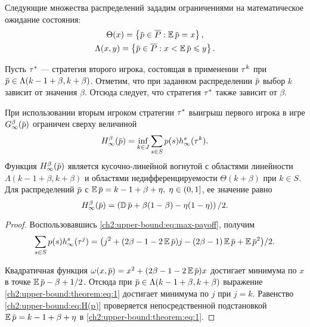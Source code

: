{Следующие множества распределений зададим ограничениями на математическое ожидание состояния:
\begin{gather*}
  \Theta(x) = \left\{ \pd \in \PM: \E \pd = x \right\}, \\
  \Lambda(x, y) = \left\{ \pd \in \PM: x < \E \pd \leqslant y \right\}.
\end{gather*}

Пусть $\tau^*$ --- стратегия второго игрока, состоящая в применении $\tau^k$ при $\pd \in \Lambda(k-1+\beta,k+\beta)$.
Отметим, что при заданном распределении $\pd$ выбор $k$ зависит от значения $\beta$.
Отсюда следует, что стратегия $\tau^*$ также зависит от $\beta$.

\begin{theorem}
  \label{ch2:upper-bound:theorem}
  При использовании вторым игроком стратегии $\tau^*$ выигрыш первого игрока в игре
  $\theG{\infty}(\pd)$ ограничен сверху величиной
  \begin{equation*}
    \H{\infty}(\pd) = \inf_{k \in J} \sum_{s \in S} \pc{s}  h^s_\infty(\taur^k).
  \end{equation*}
  Функция $\H{\infty}(\pd)$ является кусочно-линейной вогнутой с областями линейности $\Lambda(k - 1 + \beta, k + \beta)$ и областями недифференцируемости $\Theta(k+\beta)$ при $k \in S$.
  Для распределений $\pd$ с $\E \pd = k - 1 + \beta + \eta, \; \eta \in (0, 1]$, ее значение равно
  \begin{equation}
    \label{ch2:upper-bound:eq:H(p)}
    \H{\infty}(\pd) = \left( \D \pd + \beta(1-\beta) - \eta(1-\eta) \right)/2.
  \end{equation}
\end{theorem}
\begin{proof}
  Воспользовавшись \eqref{ch2:upper-bound:eq:max-payoff}, получим
  \begin{equation}
    \label{ch2:upper-bound:theorem:eq:1}
    \begin{gathered}
    \sum_{s \in S} \pc{s} h^s_\infty(\taur^j) = \bigl(
      j^2 + (2\beta - 1 - 2 \E \pd)j - (2\beta - 1) \E \pd + \E \pd^2 
    \bigr)/2.
    \end{gathered}
  \end{equation}
  
  Квадратичная функция $\omega(x, \pd) = x^2 + (2\beta - 1 - 2\E \pd)x$ достигает минимума по $x$ в точке
  $\E \pd - \beta + 1/2$.
  Отсюда при $\pd \in \Lambda(k - 1 + \beta, k + \beta)$ выражение \eqref{ch2:upper-bound:theorem:eq:1} достигает минимума по $j$ при $j = k$.
  Равенство \eqref{ch2:upper-bound:eq:H(p)} проверяется непосредственной подстановкой $\E \pd = k - 1 + \beta + \eta$ в \eqref{ch2:upper-bound:theorem:eq:1}.
\end{proof}

}
